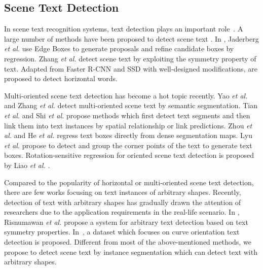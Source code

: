 \documentclass[runningheads]{llncs}
\begin{document}
\subsection{Scene Text Detection}
In scene text recognition systems, text detection plays an important role~\cite{zhu2016scene}. A large number of methods have been proposed to detect scene text \cite{epshtein2010detecting,neumann2010method,neumann2012real,yao2012detecting,huang2014robust,kang2014orientation,zhang2015symmetry,jaderberg2016reading,tian2015text,zhang2015symmetry,zhong2016deeptext,liao2017textboxes,yao2016scene,zhang2016multi,liu2017deep,he2017single,tian2016detecting,shi2017detecting,zhou2017east,he2017deep,lyu2018multi,liao2018rotation}. 
In \cite{jaderberg2016reading}, Jaderberg \emph{et al.} use Edge Boxes \cite{zitnick2014edge} to generate proposals and refine candidate boxes by regression. 
Zhang \emph{et al.} \cite{zhang2015symmetry} detect scene text by exploiting the symmetry property of text. 
Adapted from Faster R-CNN \cite{ren2015faster} and SSD \cite{liu2016ssd} with well-designed modifications, \cite{zhong2016deeptext,liao2017textboxes} are proposed to detect horizontal words.

Multi-oriented scene text detection has become a hot topic recently. Yao \emph{et al.} \cite{yao2016scene} and Zhang \emph{et al.} \cite{zhang2016multi} detect multi-oriented scene text by semantic segmentation. 
Tian \emph{et al.} \cite{tian2016detecting} and Shi \emph{et al.} \cite{shi2017detecting} propose methods which first detect text segments and then link  them into text instances by spatial relationship or link predictions.
Zhou \emph{et al.} \cite{zhou2017east} and He \emph{et al.} \cite{he2017deep} regress text boxes directly from dense segmentation maps. 
Lyu \emph{et al.} \cite{lyu2018multi} propose to detect and group the corner points of the text to generate text boxes. Rotation-sensitive regression for oriented scene text detection is proposed by Liao \emph{et al.} \cite{liao2018rotation}.

Compared to the popularity of horizontal or multi-oriented scene text detection, there are few works focusing on text instances of arbitrary shapes. 
Recently, detection of text with arbitrary shapes has gradually drawn the attention of researchers due to the application requirements in the real-life scenario. In \cite{risnumawan2014robust}, Risnumawan \emph{et al.} propose a system for arbitrary text detection based on text symmetry properties. In~\cite{CK2017}, a dataset which focuses on curve orientation text detection is proposed. Different from most of the above-mentioned methods, we propose to detect scene text by instance segmentation which can detect text with arbitrary shapes.
\end{document}
